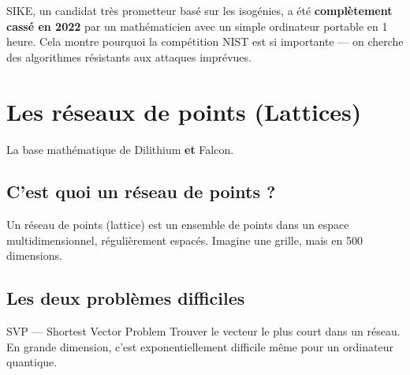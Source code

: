 \documentclass[12pt, a4paper]{article}
\begin{document}
\begin{attention}
SIKE, un candidat très prometteur basé sur les isogénies, a été \textbf{complètement cassé
en 2022} par un mathématicien avec un simple ordinateur portable en 1 heure.
Cela montre pourquoi la compétition NIST est si importante --- on cherche des
algorithmes résistants aux attaques imprévues.
\end{attention}

\section{Les réseaux de points (Lattices)}

La base mathématique de Dilithium \textbf{et} Falcon.

\subsection{C'est quoi un réseau de points ?}

Un réseau de points (lattice) est un ensemble de points dans un espace multidimensionnel,
régulièrement espacés. Imagine une grille, mais en 500 dimensions.

\begin{center}
\end{center}

\subsection{Les deux problèmes difficiles}

\begin{definition}{SVP --- Shortest Vector Problem}
Trouver le vecteur le plus court dans un réseau. En grande dimension, c'est
exponentiellement difficile même pour un ordinateur quantique.
\end{definition}
\end{document}
